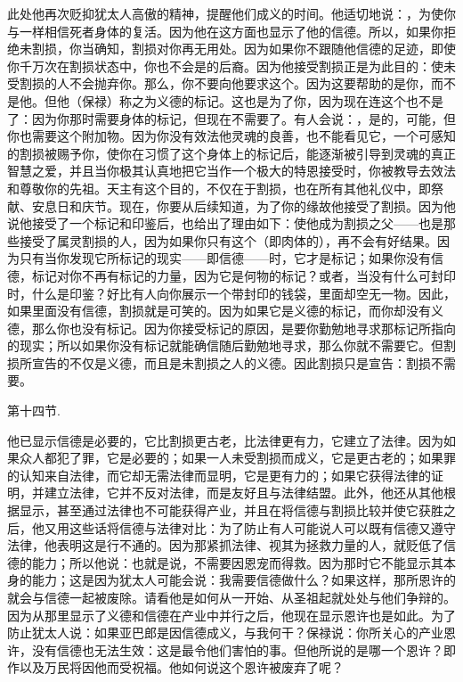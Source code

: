 此处他再次贬抑犹太人高傲的精神，提醒他们成义的时间。他适切地说：，为使你与一样相信死者身体的复活。因为他在这方面也显示了他的信德。所以，如果你拒绝未割损，你当确知，割损对你再无用处。因为如果你不跟随他信德的足迹，即使你千万次在割损状态中，你也不会是的后裔。因为他接受割损正是为此目的：使未受割损的人不会抛弃你。那么，你不要向他要求这个。因为这要帮助的是你，而不是他。但他（保禄）称之为义德的标记。这也是为了你，因为现在连这个也不是了：因为你那时需要身体的标记，但现在不需要了。有人会说：，是的，可能，但你也需要这个附加物。因为你没有效法他灵魂的良善，也不能看见它，一个可感知的割损被赐予你，使你在习惯了这个身体上的标记后，能逐渐被引导到灵魂的真正智慧之爱，并且当你极其认真地把它当作一个极大的特恩接受时，你被教导去效法和尊敬你的先祖。天主有这个目的，不仅在于割损，也在所有其他礼仪中，即祭献、安息日和庆节。现在，你要从后续知道，为了你的缘故他接受了割损。因为他说他接受了一个标记和印鉴后，也给出了理由如下：使他成为割损之父——也是那些接受了属灵割损的人，因为如果你只有这个（即肉体的），再不会有好结果。因为只有当你发现它所标记的现实——即信德——时，它才是标记；如果你没有信德，标记对你不再有标记的力量，因为它是何物的标记？或者，当没有什么可封印时，什么是印鉴？好比有人向你展示一个带封印的钱袋，里面却空无一物。因此，如果里面没有信德，割损就是可笑的。因为如果它是义德的标记，而你却没有义德，那么你也没有标记。因为你接受标记的原因，是要你勤勉地寻求那标记所指向的现实；所以如果你没有标记就能确信随后勤勉地寻求，那么你就不需要它。但割损所宣告的不仅是义德，而且是未割损之人的义德。因此割损只是宣告：割损不需要。\par

第十四节. \par

他已显示信德是必要的，它比割损更古老，比法律更有力，它建立了法律。因为如果众人都犯了罪，它是必要的；如果一人未受割损而成义，它是更古老的；如果罪的认知来自法律，而它却无需法律而显明，它是更有力的；如果它获得法律的证明，并建立法律，它并不反对法律，而是友好且与法律结盟。此外，他还从其他根据显示，甚至通过法律也不可能获得产业，并且在将信德与割损比较并使它获胜之后，他又用这些话将信德与法律对比：为了防止有人可能说人可以既有信德又遵守法律，他表明这是行不通的。因为那紧抓法律、视其为拯救力量的人，就贬低了信德的能力；所以他说：也就是说，不需要因恩宠而得救。因为那时它不能显示其本身的能力；这是因为犹太人可能会说：我需要信德做什么？如果这样，那所恩许的就会与信德一起被废除。请看他是如何从一开始、从圣祖起就处处与他们争辩的。因为从那里显示了义德和信德在产业中并行之后，他现在显示恩许也是如此。为了防止犹太人说：如果亚巴郎是因信德成义，与我何干？保禄说：你所关心的产业恩许，没有信德也无法生效：这是最令他们害怕的事。但他所说的是哪一个恩许？即作以及万民将因他而受祝福。他如何说这个恩许被废弃了呢？\par

